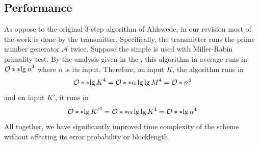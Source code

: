 \subsection{Performance}
As oppose to the original 3-step algorithm of Ahlswede, in our revision most of the work is done by the transmitter. Specifically, the transmitter runs the prime number generator \(\mathcal{A}\) twice. Suppose the simple  is used with Miller-Rabin primality test. By the analysis given in the , this algorithm in average runs in \(\bigO{\bracket{\lg n}^4}\) where \(n\) is its input. Therefore, on input \(K\), the algorithm runs in 
\begin{equation*}
    \bigO{\bracket{\lg K}^4} = \bigO{\bracket{\alpha \lg \lg M }^4} = \bigO{n^4}
\end{equation*}
and on input \(K'\), it runs in 
\begin{equation*}
    \bigO{\bracket{\lg K'}^4} = \bigO{\bracket{\alpha \lg \lg K }^4} = \bigO{\bracket{\lg n}^4}
\end{equation*}
All together, we have significantly improved time complexity of the scheme without affecting its error probability or blocklength. 
